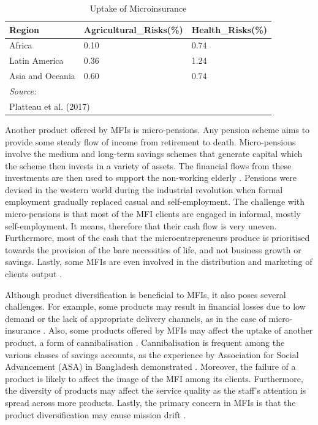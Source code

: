 \documentclass[a4paper,nobind]{templates/ociamthesis}
\begin{document}
\begin{table}

\caption{\label{tab:unnamed-chunk-12}Uptake of Microinsurance}
\centering
\fontsize{8}{10}\selectfont
\begin{tabular}[t]{lll}
\toprule
Region & Agricultural\_Risks(\%) & Health\_Risks(\%)\\
\midrule
Africa & 0.10 & 0.74\\
Latin America & 0.36 & 1.24\\
Asia and Oceania & 0.60 & 0.74\\
\bottomrule
\multicolumn{3}{l}{\rule{0pt}{1em}\textit{Source: }}\\
\multicolumn{3}{l}{\rule{0pt}{1em}Platteau et al. (2017)}\\
\end{tabular}
\end{table}

Another product offered by MFIs is micro-pensions. Any pension scheme aims to provide some steady flow of income from retirement to death. Micro-pensions involve the medium and long-term savings schemes that generate capital which the scheme then invests in a variety of assets. The financial flows from these investments are then used to support the non-working elderly \autocite{churchill2012making}. Pensions were devised in the western world during the industrial revolution when formal employment gradually replaced casual and self-employment. The challenge with micro-pensions is that most of the MFI clients are engaged in informal, mostly self-employment. It means, therefore that their cash flow is very uneven. Furthermore, most of the cash that the microentrepreneurs produce is prioritised towards the provision of the bare necessities of life, and not business growth or savings. Lastly, some MFIs are even involved in the distribution and marketing of clients output \autocite{armendariz2010economics}.

Although product diversification is beneficial to MFIs, it also poses several challenges. For example, some products may result in financial losses due to low demand or the lack of appropriate delivery channels, as in the case of micro-insurance \autocite{platteau2017demand}. Also, some products offered by MFIs may affect the uptake of another product, a form of cannibalisation \autocite{elabed2015compound}. Cannibalisation is frequent among the various classes of savings accounts, as the experience by Association for Social Advancement (ASA) in Bangladesh demonstrated \autocite{campion1999institutional,meagher2006microfinance}. Moreover, the failure of a product is likely to affect the image of the MFI among its clients. Furthermore, the diversity of products may affect the service quality as the staff's attention is spread across more products. Lastly, the primary concern in MFIs is that the product diversification may cause mission drift \autocite{christen2001commercialization,chahine2010social}.
\end{document}

